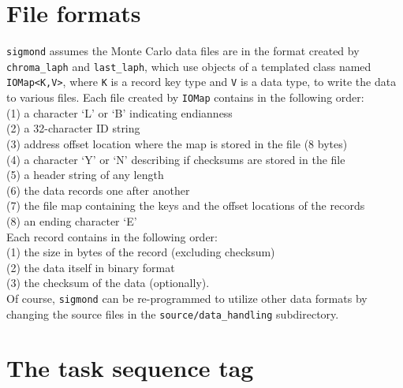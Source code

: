 \documentclass[12pt]{article}
\newcommand{\vb}{\texttt}
\begin{document}
\section{File formats}

\vb{sigmond} assumes the Monte Carlo data files are in the format
created by \vb{chroma\_laph} and \vb{last\_laph}, which use objects
of a templated class named \vb{IOMap<K,V>}, where \vb{K} is a record
key type and \vb{V} is a data type, to write the data to various
files.  Each file created by \vb{IOMap} contains in the following order:\\
\hspace*{20pt}(1) a character `L' or `B' indicating endianness\\
\hspace*{20pt}(2) a 32-character ID string\\
\hspace*{20pt}(3) address offset location where the map is stored in the file (8 bytes) \\
\hspace*{20pt}(4) a character `Y' or `N' describing if checksums are stored in the file \\
\hspace*{20pt}(5) a header string of any length\\
\hspace*{20pt}(6) the data records one after another \\
\hspace*{20pt}(7) the file map containing the keys and the offset locations of the records\\
\hspace*{20pt}(8) an ending character `E'\\
Each record contains in the following order:\\
\hspace*{20pt}(1) the size in bytes of the record (excluding checksum)\\
\hspace*{20pt}(2) the data itself in binary format\\
\hspace*{20pt}(3) the checksum of the data (optionally).\\
Of course, \vb{sigmond} can be re-programmed to utilize other data formats
by changing the source files in the \vb{source/data\_handling} subdirectory.


\section{The task sequence tag}
\end{document}
